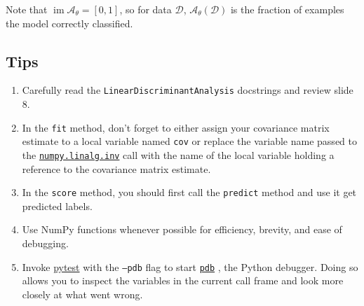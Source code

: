 \documentclass{article}
\numberwithin{equation}{section}
\newcommand{\pytest}{\href{https://docs.pytest.org/en/stable/}{pytest}}
\newcommand{\npinv}{%
    \href{%
        https://numpy.org/doc/stable/reference/generated/numpy.linalg.inv.html%
    }{\texttt{numpy.linalg.inv}}%
}
\newcommand{\pdb}{%
    \href{https://docs.python.org/3/library/pdb.html}{\texttt{pdb}}%
}
\begin{document}
Note that $ \operatorname{im}\mathcal{A}_\theta = [0, 1] $, so for
data $ \mathcal{D} $, $ \mathcal{A}_\theta(\mathcal{D}) $ is the
fraction of examples the model correctly classified.

\subsection{Tips}

\begin{enumerate}
    \item
    Carefully read the \texttt{LinearDiscriminantAnalysis} docstrings and
    review slide 8.

    \item
    In the \texttt{fit} method, don't forget to either assign your covariance
    matrix estimate to a local variable named \texttt{cov} or replace the
    variable name passed to the \npinv{} call with the name of the local
    variable holding a reference to the covariance matrix estimate.

    \item
    In the \texttt{score} method, you should first call the \texttt{predict}
    method and use it get predicted labels.    

    \item
    Use NumPy functions whenever possible for efficiency, brevity, and ease
    of debugging.

    \item
    Invoke \pytest{} with the \texttt{--pdb} flag to start \pdb, the Python
    debugger. Doing so allows you to inspect the variables in the current
    call frame and look more closely at what went wrong.
\end{enumerate}
\end{document}
